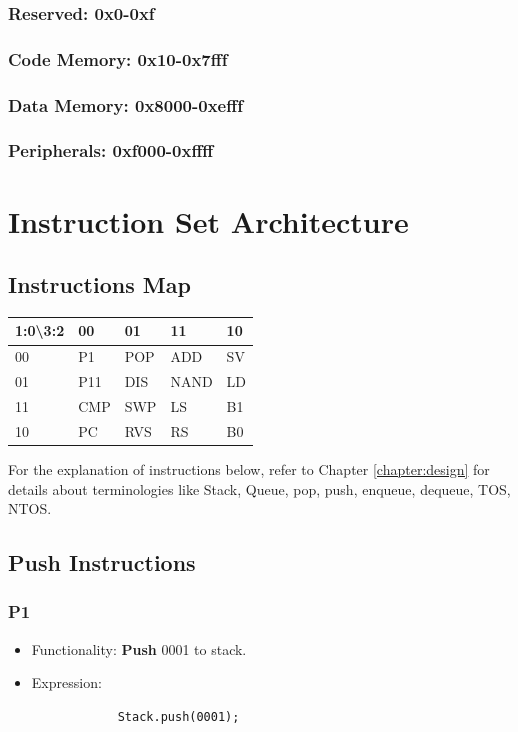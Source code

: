 \documentclass[11pt]{report}
\begin{document}
    \subsection{Reserved: 0x0-0xf}
    \subsection{Code Memory: 0x10-0x7fff}
    \subsection{Data Memory: 0x8000-0xefff}
    \subsection{Peripherals: 0xf000-0xffff}

    \chapter{Instruction Set Architecture}
    \section{Instructions Map}
    \begin{table}[h]
        \begin{tabular}{|l|l|l|l|l|}
        \hline
        1:0\textbackslash{}3:2 & 00  & 01  & 11   & 10 \\ \hline
        00                     & P1  & POP & ADD  & SV \\ \hline
        01                     & P11  & DIS & NAND & LD \\ \hline
        11                     & CMP & SWP & LS   & B1 \\ \hline
        10                     & PC  & RVS & RS   & B0 \\ \hline
        \end{tabular}
    \end{table}
    For the explanation of instructions below, refer to Chapter \ref{chapter:design} for details
    about terminologies like Stack, Queue, pop, push, enqueue, dequeue, TOS, NTOS.
    \section{Push Instructions}
    \subsection{P1}
    \begin{itemize}
        \item Functionality: \textbf{Push} 0001 to stack.
        \item Expression:
        \begin{verbatim}
            Stack.push(0001);
        \end{verbatim}
    \end{itemize}
\end{document}
